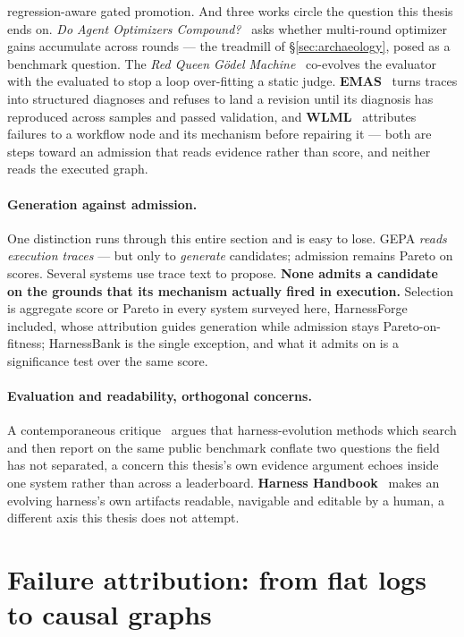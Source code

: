 regression-aware gated promotion. And three works circle the question this
thesis ends on. \emph{Do Agent Optimizers Compound?}~\cite{compound} asks
whether multi-round optimizer gains accumulate across rounds --- the
treadmill of \S\ref{sec:archaeology}, posed as a benchmark question. The
\emph{Red Queen G\"odel Machine}~\cite{redqueen} co-evolves the evaluator
with the evaluated to stop a loop over-fitting a static judge.
\textbf{EMAS}~\cite{emas} turns traces into structured diagnoses and
refuses to land a revision until its diagnosis has reproduced across
samples and passed validation, and \textbf{WLML}~\cite{wlml} attributes
failures to a workflow node and its mechanism before repairing it ---
both are steps toward an admission that reads evidence rather than
score, and neither reads the executed graph.

\paragraph{Generation against admission.} One distinction runs through this
entire section and is easy to lose. GEPA \emph{reads execution traces} ---
but only to \emph{generate} candidates; admission remains Pareto on scores.
Several systems use trace text to propose. \textbf{None admits a candidate
on the grounds that its mechanism actually fired in execution.} Selection
is aggregate score or Pareto in every system surveyed here, HarnessForge
included, whose attribution guides generation while admission stays
Pareto-on-fitness; HarnessBank is the single exception, and what it admits
on is a significance test over the same score.

\paragraph{Evaluation and readability, orthogonal concerns.} A
contemporaneous critique~\cite{rethink-harness-eval} argues that
harness-evolution methods which search and then report on the same
public benchmark conflate two questions the field has not separated, a
concern this thesis's own evidence argument echoes inside one system
rather than across a leaderboard. \textbf{Harness
Handbook}~\cite{harness-handbook} makes an evolving harness's own
artifacts readable, navigable and editable by a human, a different axis
this thesis does not attempt.

\section{Failure attribution: from flat logs to causal graphs}
\label{sec:attribution}

